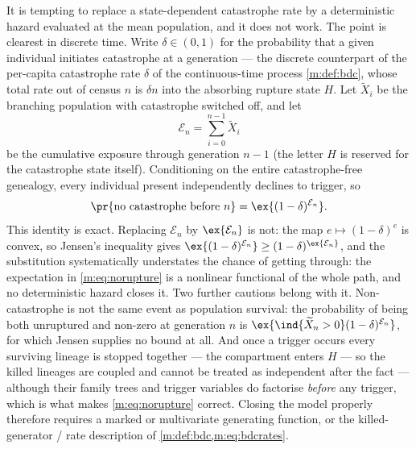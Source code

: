 \begin{remark}
\label{m:rem:notmeanfield}
It is tempting to replace a state-dependent catastrophe rate by a deterministic
hazard evaluated at the mean population, and it does not work. The point is
clearest in discrete time. Write $\delta\in(0,1)$ for the probability that a given
individual initiates catastrophe at a generation --- the discrete counterpart of
the per-capita catastrophe rate $\delta$ of the continuous-time process
\cref{m:def:bdc}, whose total rate out of census $n$ is $\delta n$ into the
absorbing rupture state $H$. Let $\widetilde X_i$ be the branching population with
catastrophe switched off, and let
\begin{equation*}
\mathcal{E}_n = \sum_{i=0}^{n-1}\widetilde X_i
\end{equation*}
be the cumulative exposure through generation $n-1$ (the letter $H$ is reserved
for the catastrophe state itself). Conditioning on the entire catastrophe-free
genealogy, every individual present independently declines to trigger, so
\begin{equation}
\label{m:eq:norupture}
\pr{\text{no catastrophe before }n} = \ex{(1-\delta)^{\mathcal{E}_n}} .
\end{equation}
This identity is exact. Replacing $\mathcal{E}_n$ by $\ex{\mathcal{E}_n}$ is not:
the map $e\mapsto(1-\delta)^e$ is convex, so Jensen's inequality gives
$\ex{(1-\delta)^{\mathcal{E}_n}}\ge(1-\delta)^{\ex{\mathcal{E}_n}}$, and the
substitution systematically understates the chance of getting through: the
expectation in \cref{m:eq:norupture} is a nonlinear functional of the whole path,
and no deterministic hazard closes it.
Two further cautions belong with it. Non-catastrophe is not the same event as
population survival: the probability of being both unruptured and non-zero at
generation $n$ is $\ex{\ind\{\widetilde X_n>0\}(1-\delta)^{\mathcal{E}_n}}$, for
which Jensen supplies no bound at all. And once a trigger occurs every surviving
lineage is stopped together --- the compartment enters $H$ --- so the killed
lineages are coupled and cannot be treated as independent after the fact ---
although their family trees and trigger variables do factorise \emph{before} any
trigger, which is what makes \cref{m:eq:norupture} correct. Closing the model
properly therefore requires a marked or multivariate generating function, or the
killed-generator / rate description of \cref{m:def:bdc,m:eq:bdcrates}.
\end{remark}

